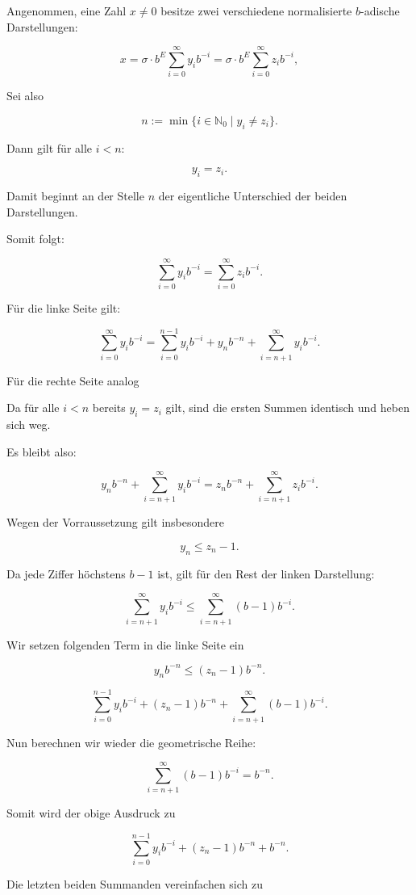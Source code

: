 \documentclass{article}
\begin{document}
Angenommen, eine Zahl \(x\neq 0\) besitze zwei verschiedene normalisierte \(b\)-adische Darstellungen:

\[
x=\sigma\cdot b^E\sum_{i=0}^{\infty} y_i b^{-i}
=
\sigma\cdot b^E\sum_{i=0}^{\infty} z_i b^{-i},
\]

Sei also

\[
n:=\min\{i\in\mathbb{N}_0\mid y_i\neq z_i\}.
\]

Dann gilt für alle \(i<n\):

\[
y_i=z_i.
\]

Damit beginnt an der Stelle \(n\) der eigentliche Unterschied der beiden Darstellungen.

Somit folgt:

\[
\sum_{i=0}^{\infty} y_i b^{-i}
=
\sum_{i=0}^{\infty} z_i b^{-i}.
\]

Für die linke Seite gilt:

\[
\sum_{i=0}^{\infty} y_i b^{-i}
=
\sum_{i=0}^{n-1} y_i b^{-i}
+
y_n b^{-n}
+
\sum_{i=n+1}^{\infty} y_i b^{-i}.
\]

Für die rechte Seite analog


Da für alle \(i<n\) bereits \(y_i=z_i\) gilt, sind die ersten Summen identisch und heben sich weg.

Es bleibt also:

\[
y_n b^{-n}
+
\sum_{i=n+1}^{\infty} y_i b^{-i}
=
z_n b^{-n}
+
\sum_{i=n+1}^{\infty} z_i b^{-i}.
\]

Wegen der Vorraussetzung gilt insbesondere

\[
y_n\leq z_n-1.
\]

Da jede Ziffer höchstens \(b-1\) ist, gilt für den Rest der linken Darstellung:

\[
\sum_{i=n+1}^{\infty} y_i b^{-i}
\leq
\sum_{i=n+1}^{\infty} (b-1)b^{-i}.
\]

Wir setzen folgenden Term in die linke Seite ein

\[
y_n b^{-n}\leq (z_n-1)b^{-n}.
\]

\[
\sum_{i=0}^{n-1} y_i b^{-i}
+
(z_n-1)b^{-n}
+
\sum_{i=n+1}^{\infty}(b-1)b^{-i}.
\]

Nun berechnen wir wieder die geometrische Reihe:

\[
\sum_{i=n+1}^{\infty}(b-1)b^{-i}
=
b^{-n}.
\]

Somit wird der obige Ausdruck zu

\[
\sum_{i=0}^{n-1} y_i b^{-i}
+
(z_n-1)b^{-n}
+
b^{-n}.
\]

Die letzten beiden Summanden vereinfachen sich zu
\end{document}
